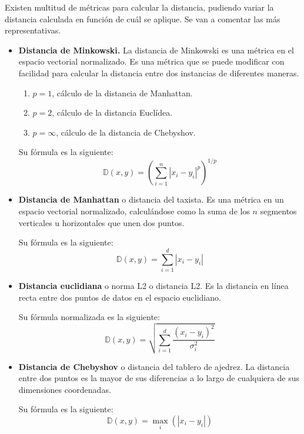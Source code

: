 Existen multitud de métricas para calcular la distancia, pudiendo variar la distancia calculada en función de cuál se aplique. Se van a comentar las más representativas.
\begin{itemize}
\item \textbf{Distancia de Minkowski.} La distancia de Minkowski es una métrica en el espacio vectorial normalizado. Es una métrica que se puede modificar con facilidad para calcular la distancia entre dos instancias de diferentes maneras. 
\begin{enumerate}
\item \(p = 1\), cálculo de la distancia de Manhattan.
\item \(p = 2\), cálculo de la distancia Euclídea.
\item \(p = \infty\), cálculo de la distancia de Chebyshov.
\end{enumerate}
Su fórmula es la siguiente:
\[ \mathbb{D}(x, y) = \left( \sum_{i=1}^{n}\left| x_i - y_i \right|^p \right)^{1/p} \]

\item \textbf{Distancia de Manhattan} o distancia del taxista. Es una métrica en un espacio vectorial normalizado, calculándose como la suma de los $n$ segmentos verticales u horizontales que unen dos puntos.

Su fórmula es la siguiente:
\[  \mathbb{D}(x, y) = \sum_{i=1}^{d}\left| x_i - y_i\right| \]

\item \textbf{Distancia euclidiana} o norma L2 o distancia L2. Es la distancia en línea recta entre dos puntos de datos en el espacio euclidiano.

Su fórmula normalizada es la siguiente:
\[  \mathbb{D}(x, y) = \sqrt{\sum_{i=1}^{d} \frac{\left(x_i - y_i\right)^2}{\sigma_i^2}}  \]

\item \textbf{Distancia de Chebyshov} o distancia del tablero de ajedrez. La distancia entre dos puntos es la mayor de sus diferencias a lo largo de cualquiera de sus dimensiones coordenadas.

Su fórmula es la siguiente:
\[  \mathbb{D}(x, y) = \max_i\left(\left|x_i - y_i\right|\right) \]

\end{itemize}
